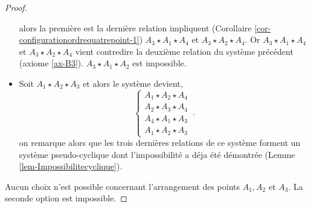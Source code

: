 \begin{cor}
\begin{proof}
\begin{itemize}[$\bullet$]
            alors la première est la dernière relation impliquent (Corollaire \ref{cor-configurationordrequatrepoint-1}) $A_3 \star A_1 \star A_4$ et $A_3 \star A_2 \star A_4$. Or  $A_3 \star A_1 \star A_4$ et $A_3 \star A_2 \star A_4$ vient contredire la deuxième relation du système précédent (axiome \ref{ax-B3}). $A_3 \star A_1 \star A_2$ est impossible.
            \item Soit $A_1 \star A_2 \star A_3$ et alors le système devient,
            \begin{equation*}
            \left\{
            \begin{array}{c}
                 A_1 \star A_2 \star A_4 \\
                 A_2 \star A_3 \star A_4 \\
                 A_4 \star A_1 \star A_3 \\
                 A_1 \star A_2 \star A_3
            \end{array}
            \right. \,.
            \end{equation*}
            on remarque alors que les trois dernières relations de ce système forment un système pseudo-cyclique dont l'impossibilité a déja été démontrée (Lemme \ref{lem-Impossibilitecyclique}). 
        \end{itemize}
        Aucun choix n'est possible concernant l'arrangement des points $A_1,A_2$ et $A_3$. La seconde option est impossible.


\end{proof}
\end{cor}
